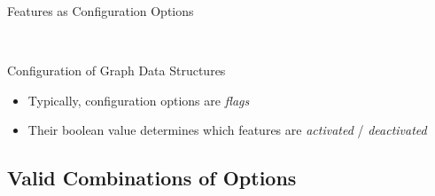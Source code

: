 \begin{frame}{Features as Configuration Options}
	\begin{mycolumns}[columns=3,widths={25,25},animation=none]
	\mynextcolumn
	\mynextcolumn
		\pause{}
		\hfill
		
		~\pause
		
		\begin{note}{Configuration of Graph Data Structures}
			\begin{itemize}
				\item Typically, configuration options are \emph{flags}
				\item Their boolean value determines which features are \emph{activated} / \emph{deactivated}
			\end{itemize}
		\end{note}
	\end{mycolumns}
\end{frame}

\subsection{Valid Combinations of Options}

